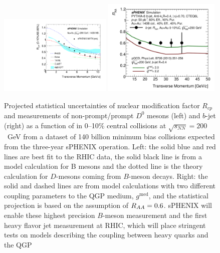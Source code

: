 \begin{figure}[htbp]
\centering
\includegraphics[width=0.48\textwidth]{figs/Rcp_proj_140B_theory.pdf}
\includegraphics[width=0.5\textwidth]{figs/200pp_pythia8_CTEQ6L_7GeV_ALL_cfg_eneg_DSTReader_root_Draw_HFJetTruth_CrossSection2RAA_Theory_3yr_deta0_70.pdf}
\caption{Projected statistical uncertainties of nuclear modification factor $R_{cp}$ and \raa measurements of non-prompt/prompt $D^0$ mesons (left) and $b$-jet (right) as a function of \pT in 0--10\% central \auau collisions at $\sqrt{s_{NN}}=200$~GeV from a dataset of 140 billion minimum bias \auau collisions expected from the three-year sPHENIX operation. Left: the solid blue and red lines are best fit to the RHIC data, the solid black line is from a model calculation for B mesons and the dotted line is the theory calculation for $D$-mesons coming from $B$-meson decays. Right: the solid and dashed lines are from model calculations with two different coupling parameters to the QGP medium, $g^{\textrm{med}}$, and the statistical projection is based on the assumption of $\mbox{$R_{AA}$} =0.6$. sPHENIX will enable these highest precision $B$-meson measurement and the first heavy flavor jet measurement at RHIC, which will place stringent tests on models describing the coupling between heavy quarks and the QGP~\cite{Huang:2013vaa,Duke,TAMU,PHSD,CUJET}}
\label{fig:HF-inclusive-RAA}
\end{figure}

